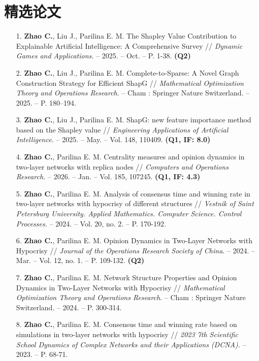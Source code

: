 \documentclass[letterpaper,10pt]{ctexart}
\begin{document}
\section{精选论文}
\begin{enumerate}
  \fontsize{10}{10.5}\selectfont
  \item [1.] \textbf{Zhao C.}, Liu J., Parilina E. M. The Shapley Value Contribution to Explainable Artificial Intelligence: A Comprehensive Survey // {\it Dynamic Games and Applications.} -- 2025. -- Oct. -- P. 1-38. {\bf (Q2)}
  \item [2.] \textbf{Zhao C.}, Liu J., Parilina E. M. Complete-to-Sparse: A Novel Graph Construction Strategy for Efficient ShapG // {\it Mathematical Optimization Theory and Operations Research}. -- Cham : Springer Nature Switzerland. -- 2025. -- P. 180–194.
  \item [3.] \textbf{Zhao C.}, Liu J., Parilina E. M. ShapG: new feature importance method based on the Shapley value // {\it Engineering Applications of Artificial Intelligence.} -- 2025. -- May. -- Vol. 148, 110409. {\bf (Q1, IF: 8.0)}
  \item [4.] \textbf{Zhao C.}, Parilina E. M. Centrality measures and opinion dynamics in two-layer networks with replica nodes // {\it Computers and Operations Research.} -- 2026. -- Jan. -- Vol. 185, 107245. {\bf (Q1, IF: 4.3)}
  \item [5.] \textbf{Zhao C.}, Parilina E. M. Analysis of consensus time and winning rate in two-layer networks with hypocrisy of different structures // {\it Vestnik of Saint Petersburg University. Applied Mathematics. Computer Science. Control Processes.} -- 2024. -- Vol. 20, no. 2. -- P. 170-192.
  \item [6.] \textbf{Zhao C.}, Parilina E. M. Opinion Dynamics in Two-Layer Networks with Hypocrisy // {\it Journal of the Operations Research Society of China}. -- 2024. -- Mar. -- Vol. 12, no. 1. -- P. 109-132. {\bf (Q2)}
  \item [7.] \textbf{Zhao C.}, Parilina E. M. Network Structure Properties and Opinion Dynamics in Two-Layer Networks with Hypocrisy // {\it Mathematical Optimization Theory and Operations Research}. -- Cham : Springer Nature Switzerland. -- 2024. -- P. 300-314.
        \newpage
  \item [8.] \textbf{Zhao C.}, Parilina E. M. Consensus time and winning rate based on simulations in two-layer networks with hypocrisy // {\it 2023 7th Scientific School Dynamics of Complex Networks and their Applications (DCNA).} -- 2023. -- P. 68-71.
\end{enumerate}
\end{document}

